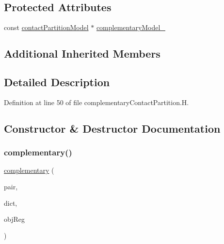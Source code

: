 \subsection*{Protected Attributes}
\begin{DoxyCompactItemize}
\item 
const \hyperlink{classFoam_1_1contactPartitionModel}{contact\+Partition\+Model} $\ast$ \hyperlink{classFoam_1_1contactPartitionModels_1_1complementary_afb5234f29a02892e7c579e0ad06f6192}{complementary\+Model\+\_\+}
\end{DoxyCompactItemize}
\subsection*{Additional Inherited Members}


\subsection{Detailed Description}


Definition at line 50 of file complementary\+Contact\+Partition.\+H.



\subsection{Constructor \& Destructor Documentation}
\mbox{\label{classFoam_1_1contactPartitionModels_1_1complementary_a706cf2521921fb662fe8935f696050a9}} 
\subsubsection{\texorpdfstring{complementary()}{complementary()}}
{\footnotesize\ttfamily \hyperlink{classFoam_1_1contactPartitionModels_1_1complementary}{complementary} (\begin{DoxyParamCaption}\item[{const \hyperlink{classFoam_1_1FSPair}{F\+S\+Pair} \&}]{pair,  }\item[{const dictionary \&}]{dict,  }\item[{const object\+Registry \&}]{obj\+Reg }\end{DoxyParamCaption})}



